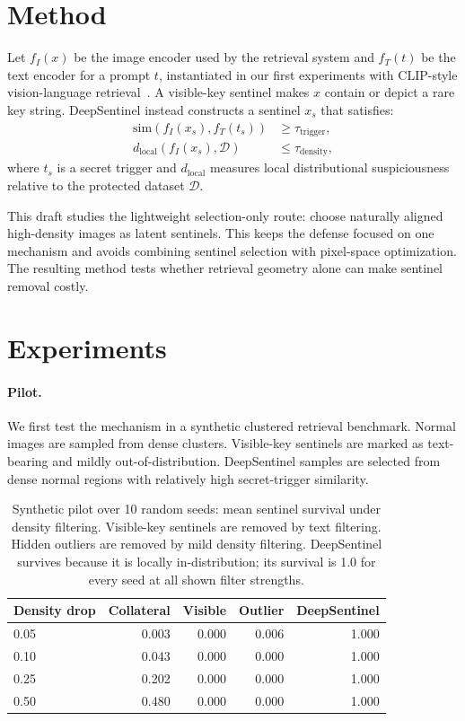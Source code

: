 \documentclass[letterpaper,twocolumn,10pt]{article}
\begin{document}
\section{Method}

Let $f_I(x)$ be the image encoder used by the retrieval system and $f_T(t)$ be
the text encoder for a prompt $t$, instantiated in our first experiments with
CLIP-style vision-language retrieval~\cite{clip2021}. A visible-key sentinel
makes $x$ contain or depict a rare key string. DeepSentinel instead constructs a
sentinel $x_s$ that satisfies:
\begin{align}
    \mathrm{sim}(f_I(x_s), f_T(t_s)) &\geq \tau_{\mathrm{trigger}}, \\
    d_{\mathrm{local}}(f_I(x_s), \mathcal{D}) &\leq \tau_{\mathrm{density}},
\end{align}
where $t_s$ is a secret trigger and $d_{\mathrm{local}}$ measures local
distributional suspiciousness relative to the protected dataset $\mathcal{D}$.

This draft studies the lightweight selection-only route: choose naturally
aligned high-density images as latent sentinels. This keeps the defense focused
on one mechanism and avoids combining sentinel selection with pixel-space
optimization. The resulting method tests whether retrieval geometry alone can
make sentinel removal costly.

\section{Experiments}

\paragraph{Pilot.}
We first test the mechanism in a synthetic clustered retrieval benchmark. Normal
images are sampled from dense clusters. Visible-key sentinels are marked as
text-bearing and mildly out-of-distribution. DeepSentinel samples are selected
from dense normal regions with relatively high secret-trigger similarity.

\begin{table}[t]
\centering
\small
\begin{tabular}{lrrrr}
\toprule
Density drop & Collateral & Visible & Outlier & DeepSentinel \\
\midrule
0.05 & 0.003 & 0.000 & 0.006 & 1.000 \\
0.10 & 0.043 & 0.000 & 0.000 & 1.000 \\
0.25 & 0.202 & 0.000 & 0.000 & 1.000 \\
0.50 & 0.480 & 0.000 & 0.000 & 1.000 \\
\bottomrule
\end{tabular}
\caption{Synthetic pilot over 10 random seeds: mean sentinel survival under
density filtering. Visible-key sentinels are removed by text filtering. Hidden
outliers are removed by mild density filtering. DeepSentinel survives because it
is locally in-distribution; its survival is 1.0 for every seed at all shown
filter strengths.}
\end{table}
\end{document}

